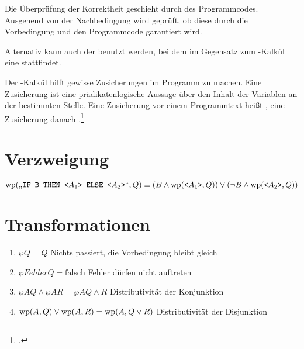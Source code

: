\documentclass{lehramt-informatik-haupt}
\begin{document}
Die Überprüfung der Korrektheit geschieht durch 
des Programmcodes. Ausgehend von der Nachbedingung wird geprüft, ob
diese durch die Vorbedingung und den Programmcode garantiert wird.

Alternativ kann auch der  benutzt werden, bei dem im
Gegensatz zum -Kalkül eine  stattfindet.

Der -Kalkül hilft gewisse Zusicherungen im Programm zu machen.
Eine Zusicherung ist eine prädikatenlogische Aussage über den Inhalt der
Variablen an der bestimmten Stelle. Eine Zusicherung vor einem
Programmtext heißt , eine Zusicherung danach
.\footcite{wiki:wp-kalkuel}

%

\section{Verzweigung}

$\text{\text{wp}}(\text{„}\texttt{IF B THEN <}A_1\texttt{> ELSE <}A_2\texttt{>}\text{“}, Q)
\equiv
(B \land \text{\text{wp}}(\texttt{<}A_1\texttt{>}, Q))
\lor
(\neg B \land \text{\text{wp}}(\texttt{<}A_2\texttt{>}, Q))$

\section{Transformationen}

\begin{enumerate}
\item $\wp{}{Q} = Q$
Nichts passiert, die Vorbedingung bleibt gleich

\item $\wp{Fehler}{Q} = \text{falsch}$
Fehler dürfen nicht auftreten

\item $\wp{A}{Q} \land \wp{A}{R} = \wp{A}{Q \land R}$
Distributivität der Konjunktion

\item $\text{\text{wp}}(A, Q) \lor \text{\text{wp}}(A, R) = \text{\text{wp}}(A, Q \lor R)$
Distributivität der Disjunktion
\end{enumerate}

%
\end{document}
